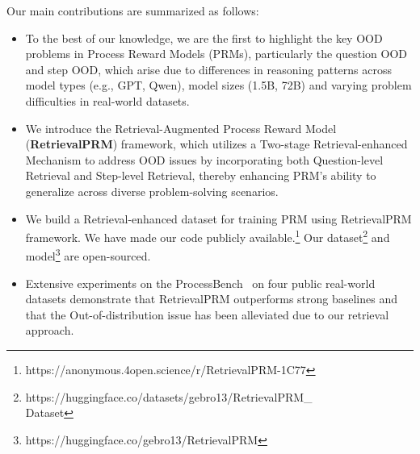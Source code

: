 \noindent Our main contributions are summarized as follows: 
\begin{itemize}[leftmargin=10pt]
    \item To the best of our knowledge, we are the first to highlight the key OOD problems in Process Reward Models (PRMs), particularly the question OOD and step OOD, which arise due to differences in reasoning patterns across model types (e.g., GPT, Qwen), model sizes (1.5B, 72B) and varying problem difficulties in real-world datasets.
    \item  We introduce the Retrieval-Augmented Process Reward Model (\textbf{RetrievalPRM}) framework, which utilizes a Two-stage Retrieval-enhanced Mechanism to address OOD issues by incorporating both Question-level Retrieval and Step-level Retrieval, thereby enhancing PRM's ability to generalize across diverse problem-solving scenarios.
    \item We build a Retrieval-enhanced dataset for training PRM using RetrievalPRM framework. We have made our code publicly available.\footnote{https://anonymous.4open.science/r/RetrievalPRM-1C77} Our dataset\footnote{https://huggingface.co/datasets/gebro13/RetrievalPRM\_\\Dataset} and model\footnote{https://huggingface.co/gebro13/RetrievalPRM} are open-sourced.
    \item Extensive experiments on the ProcessBench~\cite{zheng2024processbench} on four public real-world datasets demonstrate that RetrievalPRM outperforms strong baselines and that the Out-of-distribution issue has been alleviated due to our retrieval approach. 
\end{itemize}